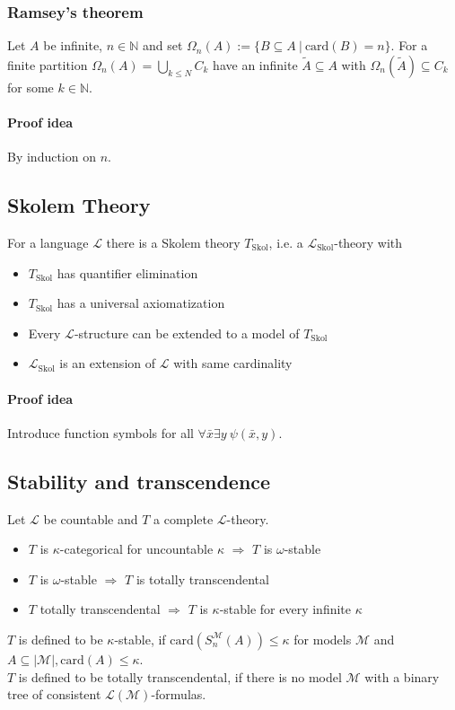 \documentclass{scrartcl}
\newcommand{\N}{\mathbb{N}}
\begin{document}
\subsubsection{Ramsey's theorem}
Let $A$ be infinite, $n \in \N$ and set $\Omega_n(A) := \{ B \subseteq A \ | \ \mathrm{card}(B) = n \}$.
For a finite partition $\Omega_n(A) = \bigcup_{k \leq N} C_k$ have an infinite $\tilde{A} \subseteq A$ with $\Omega_n(\tilde{A}) \subseteq C_k$ for some $k \in \N$.

\paragraph{Proof idea} By induction on $n$.

\subsection{Skolem Theory}
For a language $\mathcal{L}$ there is a Skolem theory $T_{\mathrm{Skol}}$, i.e. a $\mathcal{L}_{\mathrm{Skol}}$-theory with
\begin{itemize}
    \item $T_{\mathrm{Skol}}$ has quantifier elimination
    \item $T_{\mathrm{Skol}}$ has a universal axiomatization
    \item Every $\mathcal{L}$-structure can be extended to a model of $T_{\mathrm{Skol}}$
    \item $\mathcal{L}_{\mathrm{Skol}}$ is an extension of $\mathcal{L}$ with same cardinality
\end{itemize}
\paragraph{Proof idea} Introduce function symbols for all $\forall \bar{x} \exists y \ \psi(\bar{x}, y)$.

\subsection{Stability and transcendence}
\label{stability_transcendence_facts}
Let $\mathcal{L}$ be countable and $T$ a complete $\mathcal{L}$-theory.
\begin{itemize}
    \item $T$ is $\kappa$-categorical for uncountable $\kappa$ $\Rightarrow$ $T$ is $\omega$-stable
    \item $T$ is $\omega$-stable $\Rightarrow$ $T$ is totally transcendental
    \item $T$ totally transcendental $\Rightarrow$ $T$ is $\kappa$-stable for every infinite $\kappa$
\end{itemize}
$T$ is defined to be $\kappa$-stable, if $\mathrm{card}(S_n^{\mathcal{M}}(A)) \leq \kappa$ for models $\mathcal{M}$ and $A \subseteq |\mathcal{M}|, \mathrm{card}(A) \leq \kappa$.
\\
$T$ is defined to be totally transcendental, if there is no model $\mathcal{M}$ with a binary tree of consistent $\mathcal{L}(\mathcal{M})$-formulas.
\end{document}

